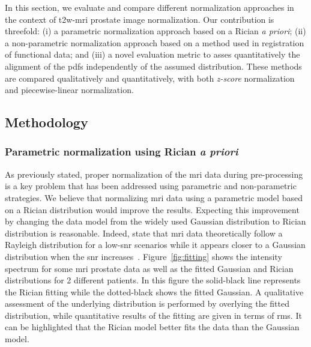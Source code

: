 In this section, we evaluate and compare different normalization approaches in the context of \ac{t2w}-\ac{mri} prostate image normalization.
Our contribution is threefold: (i) a parametric normalization approach based on a Rician \textit{a priori}; (ii) a non-parametric normalization approach based on a method used in registration of functional data; and (iii) a novel evaluation metric to asses quantitatively the alignment of the \acp{pdf} independently of the assumed distribution. 
These methods are compared qualitatively and quantitatively, with both \textit{z-score} normalization and piecewise-linear normalization.

\subsection{Methodology}\label{subsec:chp5:T2-norm:meth}

\subsubsection{Parametric normalization using Rician \textit{a priori}}\label{subsubsec:chp5:T2-norm:meth:rician}
As previously stated, proper normalization of the \ac{mri} data during pre-processing is a key problem that has been addressed using parametric and non-parametric strategies.
We believe that normalizing \ac{mri} data using a parametric model based on a Rician distribution would improve the results.
Expecting this improvement by changing the data model from the widely used Gaussian distribution to Rician distribution is reasonable.
Indeed, \citeauthor{Bernstein1989} state that \ac{mri} data theoretically follow a Rayleigh distribution for a low-\ac{snr} scenarios while it appears closer to a Gaussian distribution when the \ac{snr} increases~\cite{Bernstein1989}.
Figure~\ref{fig:fitting} shows the intensity spectrum for some \ac{mri} prostate data as well as the fitted Gaussian and Rician distributions for 2 different patients.
In this figure the solid-black line represents the Rician fitting while the dotted-black shows the fitted Gaussian.
A qualitative assessment of the underlying distribution is performed by overlying the fitted distribution, while quantitative results of the fitting are given in terms of \ac{rms}.
It can be highlighted that the Rician model better fits the data than the Gaussian model.

